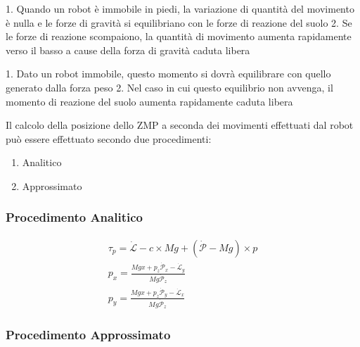 \documentclass[a4paper,portrait,12pt]{article}
\theoremstyle{definition}
\begin{document}
1. Quando un robot è immobile in piedi, la variazione di quantità del movimento è 
nulla e le forze di gravità si equilibriano con le forze di reazione del suolo
2. Se le forze di reazione scompaiono, la quantità di movimento aumenta 
rapidamente verso il basso a cause della forza di gravità caduta libera

1. Dato un robot immobile, questo momento si dovrà equilibrare con quello 
generato dalla forza peso
2. Nel caso in cui questo equilibrio non avvenga, il momento di reazione del suolo 
aumenta rapidamente caduta libera

Il calcolo della posizione dello ZMP a seconda dei
movimenti effettuati dal robot può essere effettuato
secondo due procedimenti:
\begin{enumerate}
\item Analitico
\item Approssimato
\end{enumerate}

\subsubsection{Procedimento Analitico}

\begin{align*}
\tau_p = \dot{\mathcal{L}} - c \times Mg + (\dot{\mathcal{P}} - Mg) \times p\\
p_x = \frac{Mgx + p_z\dot{\mathcal{P}}_x - \dot{\mathcal{L}}_y}{Mg \dot{\mathcal{P}}_z}\\
p_y = \frac{Mgx + p_z\dot{\mathcal{P}}_y - \dot{\mathcal{L}}_x}{Mg \dot{\mathcal{P}}_z}
\end{align*}

\subsubsection{Procedimento Approssimato}
\end{document}
